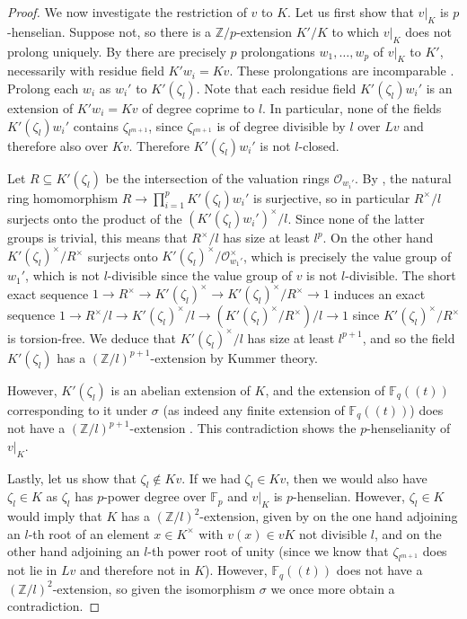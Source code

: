 \documentclass[a4paper, british, oneside]{amsart}
\newcommand{\Z}{\mathbb{Z}}
\newcommand{\F}{\mathbb{F}}
\newcommand{\pow}[1]{(\!(#1)\!)}
\theoremstyle{definition}
\theoremstyle{remark}
\begin{document}
\begin{proof}
  We now investigate the restriction of $v$ to $K$.
  Let us first show that $v|_K$ is $p$-henselian.
  Suppose not, so there is a $\Z/p$-extension $K'/K$ to which $v|_K$ does not prolong uniquely.
  By \cite[Theorem 3.3.3]{EnglerPrestel} there are precisely $p$ prolongations $w_1, \dotsc, w_p$ of $v|_K$ to $K'$,
  necessarily with residue field $K'w_i = Kv$.
  These prolongations are incomparable \cite[Lemma 3.2.8]{EnglerPrestel}.
  Prolong each $w_i$ as $w_i'$ to $K'(\zeta_l)$.
  Note that each residue field $K'(\zeta_l)w_i'$ is an extension of $K'w_i = Kv$ of degree coprime to $l$.
  In particular, none of the fields $K'(\zeta_l)w_i'$ contains $\zeta_{l^{m+1}}$,
  since $\zeta_{l^{m+1}}$ is of degree divisible by $l$ over $Lv$ and therefore also over $Kv$.
  Therefore $K'(\zeta_l)w_i'$ is not $l$-closed.

  Let $R \subseteq K'(\zeta_l)$ be the intersection of the valuation rings $\mathcal{O}_{w_i'}$.
  By \cite[Theorem 3.2.7]{EnglerPrestel},
  the natural ring homomorphism $R \to \prod_{i=1}^p K'(\zeta_l)w_i'$ is surjective,
  so in particular $R^\times/l$ surjects onto the product of the $(K'(\zeta_l)w_i')^\times/l$.
  Since none of the latter groups is trivial, this means that $R^\times/l$ has size at least $l^p$.
  On the other hand $K'(\zeta_l)^\times/R^\times$ surjects onto $K'(\zeta_l)^\times/\mathcal{O}_{w_1'}^\times$,
  which is precisely the value group of $w_1'$,
  which is not $l$-divisible since the value group of $v$ is not $l$-divisible.
  The short exact sequence $1 \to R^\times \to K'(\zeta_l)^\times \to K'(\zeta_l)^\times/R^\times \to 1$ induces an exact sequence
  $1 \to R^\times/l \to K'(\zeta_l)^\times/l \to (K'(\zeta_l)^\times/R^\times)/l \to 1$ since $K'(\zeta_l)^\times/R^\times$ is torsion-free.
  We deduce that $K'(\zeta_l)^\times/l$ has size at least $l^{p+1}$,
  and so the field $K'(\zeta_l)$ has a $(\Z/l)^{p+1}$-extension by Kummer theory.

  However, $K'(\zeta_l)$ is an abelian extension of $K$,
  and the extension of $\F_q\pow{t}$ corresponding to it under $\sigma$
  (as indeed any finite extension of $\F_q\pow{t}$)
  does not have a $(\Z/l)^{p+1}$-extension \cite[Proposition 7.5.9]{NSW}.
  This contradiction shows the $p$-henselianity of $v|_K$.

  Lastly, let us show that $\zeta_l \not\in Kv$.
  If we had $\zeta_l \in Kv$, then we would also have $\zeta_l \in K$
  as $\zeta_l$ has $p$-power degree over $\F_p$ and $v|_K$ is $p$-henselian.
  However, $\zeta_l \in K$ would imply that $K$ has a $(\Z/l)^2$-extension,
  given by on the one hand adjoining an $l$-th root of an element $x \in K^\times$
  with $v(x) \in vK$ not divisible $l$,
  and on the other hand adjoining an $l$-th power root of unity
  (since we know that $\zeta_{l^{m+1}}$ does not lie in $Lv$ and therefore not in $K$).
  However, $\F_q\pow{t}$ does not have a $(\Z/l)^2$-extension,
  so given the isomorphism $\sigma$ we once more obtain a contradiction.
\end{proof}
\end{document}
